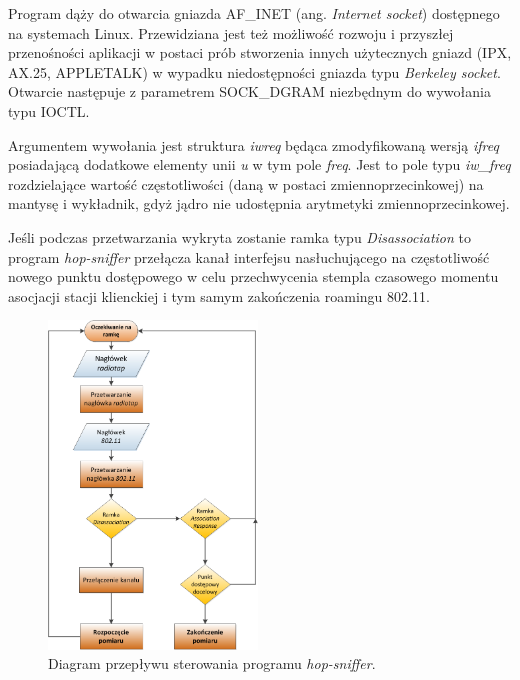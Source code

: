 Program dąży do otwarcia gniazda AF\_INET (ang. \emph{Internet socket}) dostępnego na systemach Linux. Przewidziana jest też możliwość rozwoju i przyszłej przenośności aplikacji w postaci prób stworzenia innych użytecznych gniazd (IPX, AX.25, APPLETALK) w wypadku niedostępności gniazda typu \emph{Berkeley socket}. Otwarcie następuje z parametrem SOCK\_DGRAM niezbędnym do wywołania typu IOCTL.

Argumentem wywołania jest struktura \emph{iwreq} będąca zmodyfikowaną wersją \emph{ifreq} posiadającą dodatkowe elementy unii \emph{u} w tym pole \emph{freq}. Jest to pole typu \emph{iw\_freq} rozdzielające wartość częstotliwości (daną w postaci zmiennoprzecinkowej) na mantysę i wykładnik, gdyż jądro nie udostępnia arytmetyki zmiennoprzecinkowej.


Jeśli podczas przetwarzania wykryta zostanie ramka typu \emph{Disassociation} to program \emph{hop-sniffer} przełącza kanał interfejsu nasłuchującego na częstotliwość nowego punktu dostępowego w celu przechwycenia stempla czasowego momentu asocjacji stacji klienckiej i tym samym zakończenia roamingu 802.11.


\begin{figure}[htb]
\begin{center}
\includegraphics[width=210px]{img/FlowDiagram}
\caption{Diagram przepływu sterowania programu \emph{hop-sniffer}.}
\label{FlowDiagram}
\end{center}
\end{figure}























